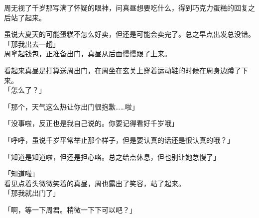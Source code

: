 周无视了千岁那写满了怀疑的眼神，问真昼想要吃什么，得到巧克力蛋糕的回复之后站了起来。

虽说大夏天的可能蛋糕不怎么好卖，但还是可能会卖完了。总之早点出发总没错。\\

「那我出去一趟」\\

周拿起钱包，正准备出门，真昼从后面慢慢跟了上来。

看起来真昼是打算送周出门，在周坐在玄关上穿着运动鞋的时候在周身边蹲了下来。\\

「怎么了？」

「那个，天气这么热让你出门很抱歉……啦」

「没事啦，反正也是我自己说的。你要记得看好千岁哦」

「呼呼，虽说千岁平常举止那个样子，但是要认真的话还是很认真的哦？」

「知道是知道啦，但还是担心咯。总之给点休息，但也别让她怠慢了」

「知道啦」\\

看见点着头微微笑着的真昼，周也露出了笑容，站了起来。\\

「那我就出门了」

「啊，等一下周君。稍微一下下可以吧？」\\

